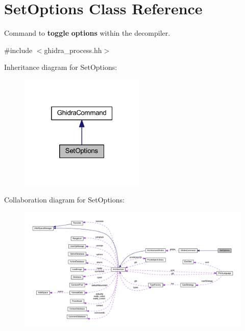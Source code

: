 \hypertarget{class_set_options}{}\section{Set\+Options Class Reference}
\label{class_set_options}


Command to {\bfseries{toggle}} {\bfseries{options}} within the decompiler.  




{\ttfamily \#include $<$ghidra\+\_\+process.\+hh$>$}



Inheritance diagram for Set\+Options\+:
\nopagebreak
\begin{figure}[H]
\begin{center}
\leavevmode
\includegraphics[width=169pt]{class_set_options__inherit__graph}
\end{center}
\end{figure}


Collaboration diagram for Set\+Options\+:
\nopagebreak
\begin{figure}[H]
\begin{center}
\leavevmode
\includegraphics[width=350pt]{class_set_options__coll__graph}
\end{center}
\end{figure}
